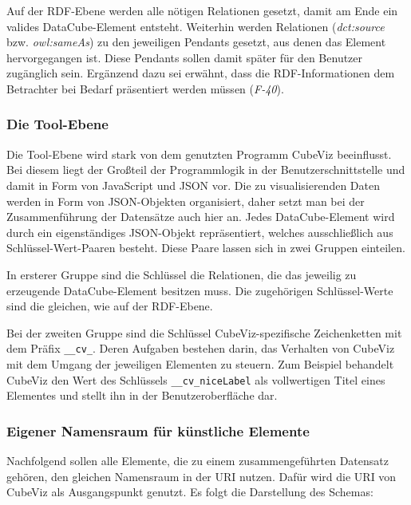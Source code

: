 \documentclass[11pt]{article}
\newcommand{\com}[1]{\marginpar{\em {\small{#1}}}} %
\begin{document}
Auf der RDF-Ebene werden alle nötigen Relationen gesetzt, damit am Ende\com{Vgl. \\ F-10, S. \pageref{req:F10source}} ein valides DataCube-Element entsteht. Weiterhin werden Relationen (\textit{dct:source} bzw. \textit{owl:sameAs}) zu den jeweiligen Pendants gesetzt, aus denen das Element hervorgegangen ist. Diese Pendants sollen damit später für den Benutzer zugänglich\com{Anforderung \\ F-40, S. \pageref{req:F40}} \label{req:F40source} sein. Ergänzend dazu sei erwähnt, dass die RDF-Informationen dem Betrachter bei Bedarf präsentiert werden müssen (\textit{F-40}).


%
%
\subsubsection{Die Tool-Ebene}
\label{sec:chapterModelToolLvl}

Die Tool-Ebene wird stark von dem genutzten Programm CubeViz beeinflusst. Bei diesem liegt der Großteil der Programmlogik in der Benutzerschnittstelle und damit in Form von JavaScript und JSON vor. Die zu visualisierenden Daten werden in Form von JSON-Objekten organisiert, daher setzt man bei der Zusammenführung der Datensätze auch hier an. Jedes DataCube-Element wird durch ein eigenständiges JSON-Objekt repräsentiert, welches ausschließlich aus Schlüssel-Wert-Paaren besteht. Diese Paare lassen sich in zwei Gruppen einteilen. 

In ersterer Gruppe sind die Schlüssel die Relationen, die das jeweilig zu erzeugende DataCube-Element besitzen muss. Die zugehörigen Schlüssel-Werte sind die gleichen, wie auf der RDF-Ebene.

Bei der zweiten Gruppe sind die Schlüssel CubeViz-spezifische Zeichenketten mit dem Präfix \verb|__cv_|. Deren Aufgaben bestehen darin, das Verhalten von CubeViz mit dem Umgang der jeweiligen Elementen zu steuern. Zum Beispiel behandelt CubeViz den Wert des Schlüssels \verb|__cv_niceLabel| als vollwertigen Titel eines Elementes und stellt ihn in der Benutzeroberfläche dar. 


%
%
\subsubsection{Eigener Namensraum für künstliche Elemente}
\label{sec:chapterModelNamespace}

Nachfolgend sollen alle Elemente, die zu einem zusammengeführten Datensatz gehören, den gleichen Namensraum in der URI nutzen. Dafür wird die URI von CubeViz als Ausgangspunkt genutzt. Es folgt die Darstellung des Schemas:
\end{document}
